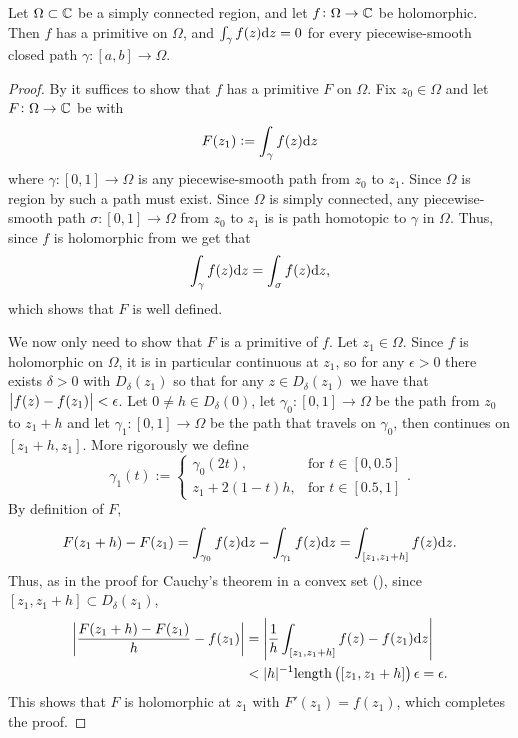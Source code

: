\documentclass[11pt,a4paper]{article}
\begin{document}
\begin{theorem}
  \label{thm:cauchy-in-simply-connected-region}
  Let $\Omega \subset \mathbb{C}$ be a simply connected region,
  and let $f \colon \Omega \to \mathbb{C}$ be holomorphic.
  Then $f$ has a primitive on $\Omega$,
  and $\int_{\gamma} f(z) \mathrm{d} z = 0$ for every piecewise-smooth closed path
  $\gamma \colon [a,b] \to \Omega$.
\end{theorem}
\begin{proof}
  By  it suffices to show that $f$ has a primitive $F$
  on $\Omega$.
  Fix $z_0 \in \Omega$ and let $F \colon \Omega \to \mathbb{C}$ be with
  \[
    F(z_1) := \int_{\gamma} f(z) \mathrm{d} z
  \]
  where $\gamma \colon [0,1] \to \Omega$ is any piecewise-smooth path
  from $z_0$ to $z_1$.
  Since $\Omega$ is region by 
  such a path must exist.
  Since $\Omega$ is simply connected,
  any piecewise-smooth path $\sigma \colon [0,1] \to \Omega$ from $z_0$ to
  $z_1$ is is path homotopic to $\gamma$ in $\Omega$.
  Thus, since $f$ is holomorphic from
   we get that
  \[
    \int_{\gamma} f(z) \mathrm{d} z =
    \int_{\sigma} f(z) \mathrm{d} z,
  \]
  which shows that $F$ is well defined.

  We now only need to show that $F$ is a primitive of $f$.
  Let $z_1 \in \Omega$.
  Since $f$ is holomorphic on $\Omega$, it is in particular continuous
  at $z_1$, so for any $\epsilon > 0$ there exists $\delta > 0$
  with $D_{\delta}(z_1)$ so that for any $z \in D_{\delta}(z_1)$ we have
  that $\left\lvert f(z) - f(z_1)\right\rvert < \epsilon$.
  Let $0 \neq h \in D_{\delta}(0)$, let $\gamma_0 \colon [0,1] \to \Omega$
  be the path from $z_0$ to $z_1 + h$ and let
  $\gamma_1 \colon [0,1] \to \Omega$ be the path that travels on $\gamma_0$,
  then continues on $[z_1+h,z_1]$.
  More rigorously we define
  \[
    \gamma_1(t) :=
    \begin{cases}
      \gamma_0(2t), &\text{for } t \in [0,0.5] \\
      z_1 + 2 (1 - t) h, &\text{for } t \in [0.5,1]
    \end{cases}.
  \]
  By definition of $F$,
  \[
    F(z_1 + h) - F(z_1) =
    \int_{\gamma_0} f(z) \mathrm{d} z -
    \int_{\gamma_1} f(z) \mathrm{d} z =
    \int_{[z_1,z_1+h]} f(z) \mathrm{d} z.
  \]
  Thus, as in the proof for Cauchy's theorem in a convex set
  (), since $[z_1,z_1+h] \subset D_{\delta}(z_1)$,
  \begin{align*}
    \abs{\frac{F(z_1 + h) - F(z_1)}{h} - f(z_1)} &=
    \abs{\frac{1}{h} \int_{[z_1,z_1+h]} f(z) - f(z_1) \dz} \\ &<
    |h|^{-1} \length\del{[z_1,z_1+h]} \epsilon = \epsilon.
  \end{align*}
  This shows that $F$ is holomorphic at $z_1$ with $F'(z_1) = f(z_1)$,
  which completes the proof.
\end{proof}
\end{document}
